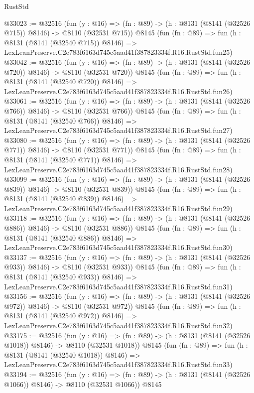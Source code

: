 \begin{lexlean}{RustStd}
\begin{coremodule}
@33023 := @32516
    (fun (y : @16) => (fn : @89) -> (h : @8131 (@8141 (@32526 @715)) @8146) -> @8110 (@32531 @715))
    @8145
    (fun (fn : @89) =>
    fun (h : @8131 (@8141 (@32540 @715)) @8146) =>
    LexLeanPreserve.C2e783f6163d745c5aad41f387823334f.R16.RustStd.fun25)
@33042 := @32516
    (fun (y : @16) => (fn : @89) -> (h : @8131 (@8141 (@32526 @720)) @8146) -> @8110 (@32531 @720))
    @8145
    (fun (fn : @89) =>
    fun (h : @8131 (@8141 (@32540 @720)) @8146) =>
    LexLeanPreserve.C2e783f6163d745c5aad41f387823334f.R16.RustStd.fun26)
@33061 := @32516
    (fun (y : @16) => (fn : @89) -> (h : @8131 (@8141 (@32526 @766)) @8146) -> @8110 (@32531 @766))
    @8145
    (fun (fn : @89) =>
    fun (h : @8131 (@8141 (@32540 @766)) @8146) =>
    LexLeanPreserve.C2e783f6163d745c5aad41f387823334f.R16.RustStd.fun27)
@33080 := @32516
    (fun (y : @16) => (fn : @89) -> (h : @8131 (@8141 (@32526 @771)) @8146) -> @8110 (@32531 @771))
    @8145
    (fun (fn : @89) =>
    fun (h : @8131 (@8141 (@32540 @771)) @8146) =>
    LexLeanPreserve.C2e783f6163d745c5aad41f387823334f.R16.RustStd.fun28)
@33099 := @32516
    (fun (y : @16) => (fn : @89) -> (h : @8131 (@8141 (@32526 @839)) @8146) -> @8110 (@32531 @839))
    @8145
    (fun (fn : @89) =>
    fun (h : @8131 (@8141 (@32540 @839)) @8146) =>
    LexLeanPreserve.C2e783f6163d745c5aad41f387823334f.R16.RustStd.fun29)
@33118 := @32516
    (fun (y : @16) => (fn : @89) -> (h : @8131 (@8141 (@32526 @886)) @8146) -> @8110 (@32531 @886))
    @8145
    (fun (fn : @89) =>
    fun (h : @8131 (@8141 (@32540 @886)) @8146) =>
    LexLeanPreserve.C2e783f6163d745c5aad41f387823334f.R16.RustStd.fun30)
@33137 := @32516
    (fun (y : @16) => (fn : @89) -> (h : @8131 (@8141 (@32526 @933)) @8146) -> @8110 (@32531 @933))
    @8145
    (fun (fn : @89) =>
    fun (h : @8131 (@8141 (@32540 @933)) @8146) =>
    LexLeanPreserve.C2e783f6163d745c5aad41f387823334f.R16.RustStd.fun31)
@33156 := @32516
    (fun (y : @16) => (fn : @89) -> (h : @8131 (@8141 (@32526 @972)) @8146) -> @8110 (@32531 @972))
    @8145
    (fun (fn : @89) =>
    fun (h : @8131 (@8141 (@32540 @972)) @8146) =>
    LexLeanPreserve.C2e783f6163d745c5aad41f387823334f.R16.RustStd.fun32)
@33175 := @32516
    (fun (y : @16) =>
    (fn : @89) -> (h : @8131 (@8141 (@32526 @1018)) @8146) -> @8110 (@32531 @1018))
    @8145
    (fun (fn : @89) =>
    fun (h : @8131 (@8141 (@32540 @1018)) @8146) =>
    LexLeanPreserve.C2e783f6163d745c5aad41f387823334f.R16.RustStd.fun33)
@33194 := @32516
    (fun (y : @16) =>
    (fn : @89) -> (h : @8131 (@8141 (@32526 @1066)) @8146) -> @8110 (@32531 @1066))
    @8145

\end{coremodule}
\end{lexlean}
